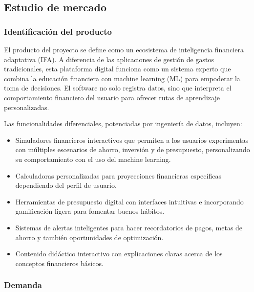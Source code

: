 {}
\subsection*{Estudio de mercado}

{}
\subsubsection*{Identificación del producto}

El producto del proyecto se define como un ecosistema de inteligencia financiera adaptativa (IFA). A diferencia de las aplicaciones de gestión de gastos tradicionales, esta plataforma digital funciona como un sistema experto que combina la educación financiera con machine learning (ML) para empoderar la toma de decisiones. El software no solo registra datos, sino que interpreta el comportamiento financiero del usuario para ofrecer rutas de aprendizaje personalizadas.

Las funcionalidades diferenciales, potenciadas por ingeniería de datos, incluyen:

\begin{itemize}
	\item Simuladores financieros interactivos que permiten a los usuarios experimentas con múltiples escenarios de ahorro, inversión y de presupuesto, personalizando su comportamiento con el uso del machine learning.
	
	\item Calculadoras personalizadas para proyecciones financieras específicas dependiendo del perfil de usuario.
	
	\item Herramientas de presupuesto digital con interfaces intuitivas e incorporando gamificación ligera para fomentar buenos hábitos.
	
	\item Sistemas de alertas inteligentes para hacer recordatorios de pagos, metas de ahorro y también oportunidades de optimización.
	
	\item Contenido didáctico interactivo con explicaciones claras acerca de los conceptos financieros básicos.
	
\end{itemize}

{}
\subsubsection*{Demanda}

